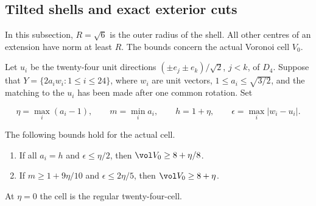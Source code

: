 \subsection{Tilted shells and exact exterior cuts}
\label{sec:exact-shell}

In this subsection, $R=\sqrt6$ is the outer radius of the shell.
All other centres of an extension have norm at least $R$.
The bounds concern the actual Voronoi cell $V_0$.

\begin{thm}\label{thm:exact-shell-tilt}
Let $u_i$ be the twenty-four unit directions $(\pm e_j\pm e_k)/\sqrt2$, $j<k$, of $D_4$.
Suppose that $Y=\{2a_iw_i:1\le i\le24\}$, where $w_i$ are unit vectors, $1\le
a_i\le\sqrt{3/2}$, and the matching to the $u_i$ has been made after one common rotation.
Set

\[
\eta=\max_i(a_i-1),\qquad m=\min_i a_i,\qquad h=1+\eta,\qquad
\epsilon=\max_i|w_i-u_i|.
\]

The following bounds hold for the actual cell.

\begin{enumerate}[label=(\roman*)]
\item If all $a_i=h$ and $\epsilon\le\eta/2$, then $\vol V_0\ge8+\eta/8$.
\item If $m\ge1+9\eta/10$ and $\epsilon\le2\eta/5$, then $\vol V_0\ge8+\eta$.
\end{enumerate}
At $\eta=0$ the cell is the regular twenty-four-cell.
\end{thm}
